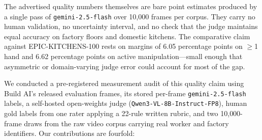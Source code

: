 \documentclass[11pt]{article}
\begin{document}
The advertised quality numbers themselves are bare point estimates produced by a single pass of
\texttt{gemini-2.5-flash} over 10{,}000 frames per corpus. They carry no human validation, no
uncertainty interval, and no check that the judge maintains equal accuracy on factory floors and
domestic kitchens. The comparative claim against EPIC-KITCHENS-100 rests on margins of 6.05
percentage points on $\geq$1 hand and 6.62 percentage points on active manipulation---small enough
that asymmetric or domain-varying judge error could account for most of the gap.

We conducted a pre-registered measurement audit of this quality claim using Build AI's released
evaluation frames, its stored per-frame \texttt{gemini-2.5-flash} labels, a self-hosted
open-weights judge (\texttt{Qwen3-VL-8B-Instruct-FP8}), \vernierNPrimary{} human gold labels from
one rater applying a 22-rule written rubric, and two 10{,}000-frame draws from the raw video
corpus carrying real worker and factory identifiers. Our contributions are fourfold:
\end{document}
